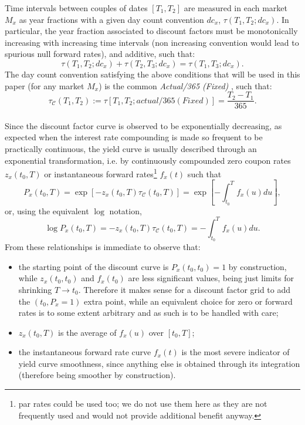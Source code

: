 \documentclass[11pt,reqno]{amsart}
\begin{document}
Time intervals between couples of dates $\left[T_{1},T_{2}\right]$ are measured in each market $M_{x}$ as year fractions with a given day count convention $dc_x$, $\tau\left(T_{1},T_{2};dc_x\right)$.
In particular, the year fraction associated to discount factors must be monotonically increasing with increasing time intervals (non increasing convention would lead to spurious null forward rates), and additive, such that:
\begin{equation}
\tau\left(T_{1},T_{2};dc_x\right) + \tau\left(T_{2},T_{3};dc_x\right)
= \tau\left(T_{1},T_{3};dc_x\right).
\end{equation}
The day count convention satisfying the above conditions that will be used in this paper (for any market $M_x$) is the common \emph{Actual/365 (Fixed)} \cite{ISDA}, such that:
\begin{equation}
\tau_{\mathcal{C}}\left(T_{1},T_{2}\right) 
:= \tau\left[T_{1},T_{2};actual/365 (Fixed)\right]
= \frac{T_2-T_1}{365}.
\end{equation}
\\ 
Since the discount factor curve is observed to be exponentially decreasing, as expected when the interest rate compounding is made so frequent to be practically continuous, the yield curve is usually described through an exponential transformation, i.e. by continuously compounded zero coupon rates $z_x(t_0,T)$ or instantaneous forward rates\footnote{par rates could be used too; we do not use them here as they are not frequently used and would not provide additional benefit anyway.} $f_x(t)$ such that
\begin{equation}
P_x(t_0,T) 
= \exp\left[-z_x\left(t_0,T\right)\tau_{\mathcal{C}}\left(t_0,T\right)\right]
= \exp\left[-\int_{t_0}^{T}f_x\left(u\right)du\right],
\label{eqn:relationship}
\end{equation}
or, using the equivalent $\log$ notation,
\begin{equation}
\log P_x(t_0,T)
= -z_x\left(t_0,T\right)\tau_{\mathcal{C}}\left(t_0,T\right)
= -\int_{t_0}^{T}f_x\left(u\right)du.
\label{eqn:logrelationship}
\end{equation}
From these relationships is immediate to observe that:
\begin{itemize}
\item the starting point of the discount curve is $P_x(t_0,t_0)=1$ by construction, while $z_x\left(t_0,t_0\right) $ and $f_x\left(t_0\right)$ are less significant values, being just limits for shrinking $T\rightarrow t_0$. Therefore it makes sense for a discount factor grid to add the $\left(t_0,P_x=1\right)$ extra point, while an equivalent choice for zero or forward rates is to some extent arbitrary and as such is to be handled with care;
\item $z_x\left(t_0,T\right)$ is the average of $f_x\left(u\right)$ over $\left[t_0,T\right]$;
\item the instantaneous forward rate curve $f_x\left(t\right)$ is the most severe indicator of yield curve smoothness, since anything else is obtained through its integration (therefore being smoother by construction).
\end{itemize}
\end{document}
